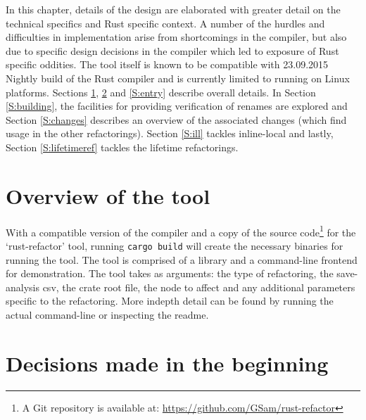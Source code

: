 In this chapter, details of the design are elaborated with greater detail on the technical specifics and Rust specific context. A number of the hurdles and difficulties in implementation arise from shortcomings in the compiler, but also due to specific design decisions in the compiler which led to exposure of Rust specific oddities. The tool itself is known to be compatible with 23.09.2015 Nightly build of the Rust compiler and is currently limited to running on Linux platforms. Sections \ref{S:iover}, \ref{S:begin} and \ref{S:entry} describe overall details. In Section \ref{S:building}, the facilities for providing verification of renames are explored and Section \ref{S:changes} describes an overview of the associated changes (which find usage in the other refactorings). Section \ref{S:ill} tackles inline-local and lastly, Section \ref{S:lifetimeref} tackles the lifetime refactorings.



\section{Overview of the tool}\label{S:iover}
With a compatible version of the compiler and a copy of the source code\footnote{A Git repository is available at: \url{https://github.com/GSam/rust-refactor}} for the `rust-refactor' tool, running {\verb|cargo build|} will create the necessary binaries for running the tool. The tool is comprised of a library and a command-line frontend for demonstration. The tool takes as arguments: the type of refactoring, the save-analysis csv, the crate root file, the node to affect and any additional parameters specific to the refactoring. More indepth detail can be found by running the actual command-line or inspecting the readme.

\section{Decisions made in the beginning}\label{S:begin}
